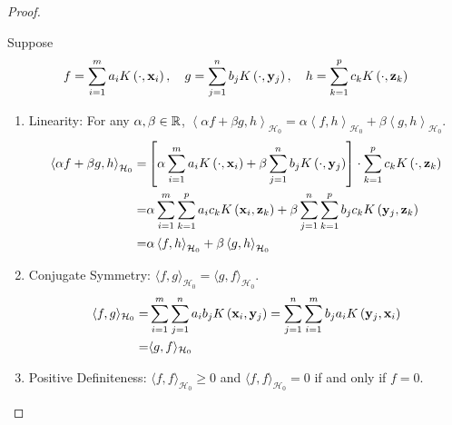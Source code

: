 \begin{proof}
\begin{enumerate}
		      Suppose
		      \begin{equation*}
			      f=\sum_{i=1}^{m}a_{i}K\left(\cdot,\mathbf{x}_{i}\right),\quad g=\sum_{j=1}^{n}b_{j}K\left(\cdot,\mathbf{y}_{j}\right),\quad h=\sum_{k=1}^{p}c_{k}K\left(\cdot,\mathbf{z}_{k}\right)
		      \end{equation*}
		      \begin{enumerate}
			      \item Linearity: For any \(\alpha,\beta\in\mathbb{R}\), \(\left\langle\alpha f+\beta g,h\right\rangle_{\mathcal{H}_{0}}=\alpha\left\langle f,h\right\rangle_{\mathcal{H}_{0}}+\beta\left\langle g,h\right\rangle_{\mathcal{H}_{0}}\).
			            \begin{equation*}
				            \begin{aligned}
					            \left\langle\alpha f+\beta g,h\right\rangle_{\mathcal{H}_{0}}= & \left[\alpha\sum_{i=1}^{m}a_{i}K\left(\cdot,\mathbf{x}_{i}\right)+\beta\sum_{j=1}^{n}b_{j}K\left(\cdot,\mathbf{y}_{j}\right)\right]\cdot\sum_{k=1}^{p}c_{k}K\left(\cdot,\mathbf{z}_{k}\right) \\
					            =                                                              & \alpha\sum_{i=1}^{m}\sum_{k=1}^{p}a_{i}c_{k}K\left(\mathbf{x}_{i},\mathbf{z}_{k}\right)+\beta\sum_{j=1}^{n}\sum_{k=1}^{p}b_{j}c_{k}K\left(\mathbf{y}_{j},\mathbf{z}_{k}\right)                \\
					            =                                                              & \alpha\left\langle f,h\right\rangle_{\mathcal{H}_{0}}+\beta\left\langle g,h\right\rangle_{\mathcal{H}_{0}}
				            \end{aligned}
			            \end{equation*}
			      \item Conjugate Symmetry: \(\langle f,g\rangle_{\mathcal{H}_{0}}=\langle g,f\rangle_{\mathcal{H}_{0}}\).
			            \begin{equation*}
				            \begin{aligned}
					            \langle f,g\rangle_{\mathcal{H}_{0}}= & \sum_{i=1}^{m}\sum_{j=1}^{n}a_{i}b_{j}K\left(\mathbf{x}_{i},\mathbf{y}_{j}\right)=\sum_{j=1}^{n}\sum_{i=1}^{m}b_{j}a_{i}K\left(\mathbf{y}_{j},\mathbf{x}_{i}\right) \\
					            =                                     & \langle g,f\rangle_{\mathcal{H}_{0}}
				            \end{aligned}
			            \end{equation*}
			      \item Positive Definiteness: \(\langle f,f\rangle_{\mathcal{H}_{0}}\geq 0\) and \(\langle f,f\rangle_{\mathcal{H}_{0}}=0\) if and only if \(f=0\).


\end{enumerate}
\end{enumerate}
\end{proof}
